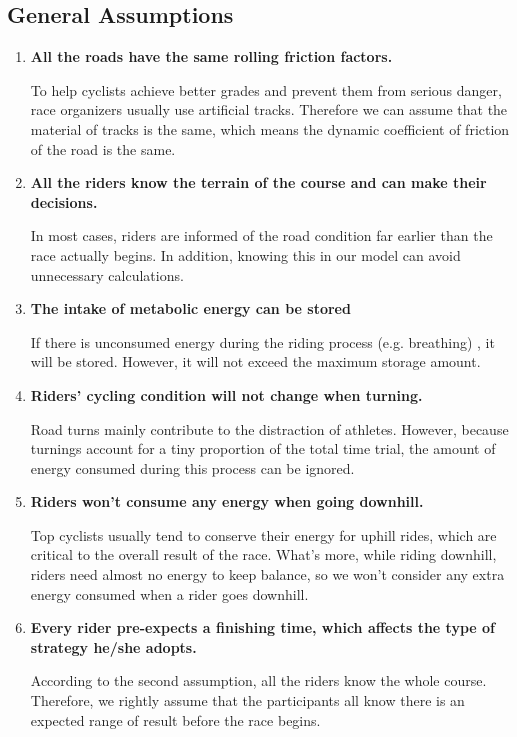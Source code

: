 \documentclass[12pt]{article}
\theoremstyle{definition}
\theoremstyle{remark}
\numberwithin{equation}{section}
\begin{document}
	\subsection{General Assumptions}
	\begin{enumerate}
		\item  \textbf{All the roads have the same rolling friction factors.}

				To help cyclists achieve better grades and prevent them from serious danger, race organizers usually use artificial tracks. Therefore we can assume that the material of tracks is the same, which means the dynamic coefficient of friction of the road is the same.
		\item  \textbf{All the riders know the terrain of the course and can make their decisions.}

				In most cases, riders are informed of the road condition far earlier than the race actually begins. In addition, knowing this in our model can avoid unnecessary calculations.
		\item  \textbf{The intake of metabolic energy can be stored}

				If there is unconsumed energy during the riding process (e.g. breathing) , it will be stored. However, it will not exceed the maximum storage amount.
		\item  \textbf{Riders' cycling condition will not change when turning.}

				Road turns mainly contribute to the distraction of athletes. However, because turnings account for a tiny proportion of the total time trial, the amount of energy consumed during this process can be ignored.
		\item \textbf{Riders won't consume any energy when going downhill.}

				Top cyclists usually tend to conserve their energy for uphill rides, which are critical to the overall result of the race. What's more, while riding downhill, riders need almost no energy to keep balance, so we won't consider any extra energy consumed when a rider goes downhill.
		\item \textbf{Every rider pre-expects a finishing time, which affects the type of strategy he/she adopts.}

				According to the second assumption, all the riders know the whole course. Therefore, we rightly assume that the participants all know there is an expected range of result before the race begins.
	\end{enumerate}
\end{document}
